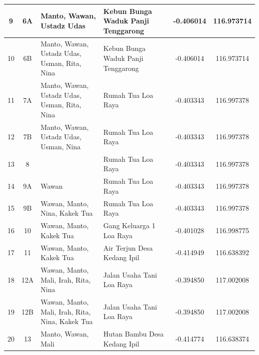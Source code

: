 \begin{landscape}
{\begin{tabularx}{\textwidth}{|c|c|l|l|c|c|}
            9  & 6A             & Manto, Wawan, Ustadz Udas                                    & Kebun Bunga Waduk Panji Tenggarong & -0.406014         & 116.973714         \\ \hline
            10 & 6B             & Manto, Wawan, Ustadz Udas, Usman, Rita,   Nina               & Kebun Bunga Waduk Panji Tenggarong & -0.406014         & 116.973714         \\ \hline
            11 & 7A             & Manto, Wawan, Ustadz Udas, Usman, Rita,   Nina               & Rumah Tua Loa Raya                 & -0.403343         & 116.997378         \\ \hline
            12 & 7B             & Manto, Wawan, Ustadz Udas, Usman, Nina                       & Rumah Tua Loa Raya                 & -0.403343         & 116.997378         \\ \hline
            13 & 8              &                                                              & Rumah Tua Loa Raya                 & -0.403343         & 116.997378         \\ \hline
            14 & 9A             & Wawan                                                        & Rumah Tua Loa Raya                 & -0.403343         & 116.997378         \\ \hline
            15 & 9B             & Wawan, Manto, Nina, Kakek Tua                                & Rumah Tua Loa Raya                 & -0.403343         & 116.997378         \\ \hline
            16 & 10             & Wawan, Manto, Kakek Tua                                      & Gang Keluarga 1 Loa Raya           & -0.401028         & 116.998775         \\ \hline
            17 & 11             & Wawan, Manto, Kakek Tua                                      & Air Terjun Desa Kedang Ipil        & -0.414949         & 116.638392         \\ \hline
            18 & 12A            & Wawan, Manto, Mali, Irah, Rita, Nina                         & Jalan Usaha Tani Loa Raya          & -0.394850         & 117.002008         \\ \hline
            19 & 12B            & Wawan, Manto, Mali, Irah, Rita, Nina,   Kakek Tua            & Jalan Usaha Tani Loa Raya          & -0.394850         & 117.002008         \\ \hline
            20 & 13             & Manto, Wawan, Mali                                           & Hutan Bambu Desa Kedang Ipil       & -0.414774         & 116.638374         \\ \hline

\end{tabularx}}
\end{landscape}
